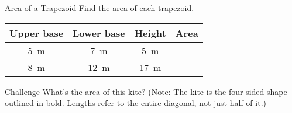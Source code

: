 \documentclass[14pt,letterpaper]{article}
\begin{document}
\begin{problem}{Area of a Trapezoid}
 Find the area of each trapezoid.

 \begin{center}
 \begin{tabular}{|c|c|c|c|}
  \hline
  Upper base & Lower base & Height & Area \\
  \hline
  \SI{5}{\metre} & \SI{7}{\metre} & \SI{5}{\metre} & \\
  \SI{8}{\metre} & \SI{12}{\metre} & \SI{17}{\metre} & \\
  \hline
 \end{tabular}
 \end{center}
\end{problem}

\begin{problem}{Challenge}
 What's the area of this kite? (Note: The kite is the four-sided shape outlined
 in bold. Lengths refer to the entire diagonal, not just half of it.)

 \begin{center}
 \end{center}
\end{problem}
\end{document}
